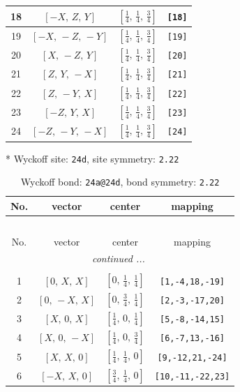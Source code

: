 \documentclass[fleqn,8pt]{jsarticle}
\begin{document}
\begin{longtable}{cccc}
18 & $\left[ - X,\, Z,\, Y \right]$ & $\left[ \frac{1}{4},\, \frac{1}{4},\, \frac{3}{4} \right]$ & {\tt [18]} \\ \hline
19 & $\left[ - X,\, - Z,\, - Y \right]$ & $\left[ \frac{1}{4},\, \frac{1}{4},\, \frac{3}{4} \right]$ & {\tt [19]} \\ \hline
20 & $\left[ X,\, - Z,\, Y \right]$ & $\left[ \frac{1}{4},\, \frac{1}{4},\, \frac{3}{4} \right]$ & {\tt [20]} \\ \hline
21 & $\left[ Z,\, Y,\, - X \right]$ & $\left[ \frac{1}{4},\, \frac{1}{4},\, \frac{3}{4} \right]$ & {\tt [21]} \\ \hline
22 & $\left[ Z,\, - Y,\, X \right]$ & $\left[ \frac{1}{4},\, \frac{1}{4},\, \frac{3}{4} \right]$ & {\tt [22]} \\ \hline
23 & $\left[ - Z,\, Y,\, X \right]$ & $\left[ \frac{1}{4},\, \frac{1}{4},\, \frac{3}{4} \right]$ & {\tt [23]} \\ \hline
24 & $\left[ - Z,\, - Y,\, - X \right]$ & $\left[ \frac{1}{4},\, \frac{1}{4},\, \frac{3}{4} \right]$ & {\tt [24]} \\
\end{longtable}
* Wyckoff site: {\tt 24d}, site symmetry: {\tt 2.22}
\renewcommand{\arraystretch}{1.2}
\begin{longtable}{cccc}
\caption{Wyckoff bond: {\tt 24a@24d}, bond symmetry: {\tt 2.22}}
 \\
 \hline \hline
No. & vector & center & mapping \\ \hline \endfirsthead

\multicolumn{3}{l}{\tablename\ \thetable{}} \\
 \hline \hline
No. & vector & center & mapping \\ \hline \endhead

 \hline \hline
\multicolumn{3}{r}{\footnotesize\it continued ...} \\ \endfoot

 \hline \hline
\multicolumn{3}{r}{} \\ \endlastfoot

1 & $\left[ 0,\, X,\, X \right]$ & $\left[ 0,\, \frac{1}{4},\, \frac{1}{4} \right]$ & {\tt [1,-4,18,-19]} \\ \hline
2 & $\left[ 0,\, - X,\, X \right]$ & $\left[ 0,\, \frac{3}{4},\, \frac{1}{4} \right]$ & {\tt [2,-3,-17,20]} \\ \hline
3 & $\left[ X,\, 0,\, X \right]$ & $\left[ \frac{1}{4},\, 0,\, \frac{1}{4} \right]$ & {\tt [5,-8,-14,15]} \\ \hline
4 & $\left[ X,\, 0,\, - X \right]$ & $\left[ \frac{1}{4},\, 0,\, \frac{3}{4} \right]$ & {\tt [6,-7,13,-16]} \\ \hline
5 & $\left[ X,\, X,\, 0 \right]$ & $\left[ \frac{1}{4},\, \frac{1}{4},\, 0 \right]$ & {\tt [9,-12,21,-24]} \\ \hline
6 & $\left[ - X,\, X,\, 0 \right]$ & $\left[ \frac{3}{4},\, \frac{1}{4},\, 0 \right]$ & {\tt [10,-11,-22,23]} \\
\end{longtable}
\end{document}
